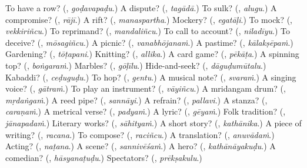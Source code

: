 \begin{tcolorbox}[breakable,colback=teal!4,colframe=teal!35!black,title={Before you move on}]
To have a row? (\textbf{}, \emph{goḍavapaḍu}.) A dispute? (\textbf{}, \emph{tagādā}.) To sulk? (\textbf{}, \emph{alugu}.) A compromise? (\textbf{}, \emph{rājī}.) A rift? (\textbf{}, \emph{manaspartha}.) Mockery? (\textbf{}, \emph{egatāḷi}.) To mock? (\textbf{}, \emph{vekkiriñcu}.) To reprimand? (\textbf{}, \emph{mandaliñcu}.) To call to account? (\textbf{}, \emph{niladīyu}.) To deceive? (\textbf{}, \emph{mōsagiñcu}.) A picnic? (\textbf{}, \emph{vanabhōjanaṁ}.) A pastime? (\textbf{}, \emph{kālakṣēpaṁ}.) Gardening? (\textbf{}, \emph{tōṭapani}.) Knitting? (\textbf{}, \emph{allika}.) A card game? (\textbf{}, \emph{pēkāṭa}.) A spinning top? (\textbf{}, \emph{boṅgaraṁ}.) Marbles? (\textbf{}, \emph{gōḷīlu}.) Hide-and-seek? (\textbf{}, \emph{dāguḍumūtalu}.) Kabaddi? (\textbf{}, \emph{ceḍuguḍu}.) To hop? (\textbf{}, \emph{gentu}.) A musical note? (\textbf{}, \emph{svaraṁ}.) A singing voice? (\textbf{}, \emph{gātraṁ}.) To play an instrument? (\textbf{}, \emph{vāyiñcu}.) A mridangam drum? (\textbf{}, \emph{mṛdaṅgaṁ}.) A reed pipe? (\textbf{}, \emph{sannāyi}.) A refrain? (\textbf{}, \emph{pallavi}.) A stanza? (\textbf{}, \emph{caraṇaṁ}.) A metrical verse? (\textbf{}, \emph{padyaṁ}.) A lyric? (\textbf{}, \emph{gēyaṁ}.) Folk tradition? (\textbf{}, \emph{jānapadaṁ}.) Literary works? (\textbf{}, \emph{sāhityaṁ}.) A short story? (\textbf{}, \emph{kathānika}.) A piece of writing? (\textbf{}, \emph{racana}.) To compose? (\textbf{}, \emph{raciñcu}.) A translation? (\textbf{}, \emph{anuvādaṁ}.) Acting? (\textbf{}, \emph{naṭana}.) A scene? (\textbf{}, \emph{sannivēśaṁ}.) A hero? (\textbf{}, \emph{kathānāyakuḍu}.) A comedian? (\textbf{}, \emph{hāsyanaṭuḍu}.) Spectators? (\textbf{}, \emph{prēkṣakulu}.)
\end{tcolorbox}
